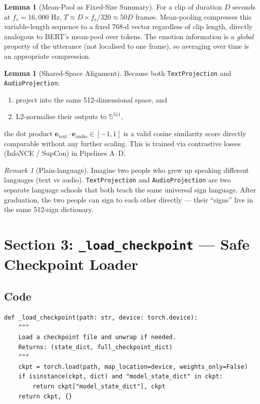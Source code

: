 \documentclass[12pt,a4paper]{article}
\theoremstyle{definition}
\newtheorem{lemma}[theorem]{Lemma}
\theoremstyle{remark}
\newtheorem{remark}[theorem]{Remark}
\begin{document}
\begin{lemma}[Mean-Pool as Fixed-Size Summary]
For a clip of duration $D$ seconds at $f_s = 16{,}000$ Hz,
$T \approx D \times f_s / 320 \approx 50D$ frames.
Mean-pooling compresses this variable-length sequence to a fixed 768-d vector
regardless of clip length, directly analogous to BERT's mean-pool over tokens.
The emotion information is a \emph{global} property of the utterance
(not localised to one frame), so averaging over time is an appropriate compression.
\end{lemma}

\begin{lemma}[Shared-Space Alignment]
Because both \texttt{TextProjection} and \texttt{AudioProjection}:
\begin{enumerate}
  \item project into the same 512-dimensional space, and
  \item L2-normalise their outputs to $\mathbb{S}^{511}$,
\end{enumerate}
the dot product
$\mathbf{e}_{\text{text}} \cdot \mathbf{e}_{\text{audio}} \in [-1, 1]$
is a valid cosine similarity score directly comparable without any further
scaling.
This is trained via contrastive losses (InfoNCE / SupCon) in Pipelines A--D.
\end{lemma}

\begin{remark}[Plain-language]
Imagine two people who grew up speaking different languages (text vs audio).
\texttt{TextProjection} and \texttt{AudioProjection} are two separate
language schools that both teach the same universal sign language.
After graduation, the two people can sign to each other directly —
their ``signs'' live in the same 512-sign dictionary.
\end{remark}

\section{Section 3: \texttt{\_load\_checkpoint} — Safe Checkpoint Loader}

\subsection{Code}

\begin{lstlisting}[caption={\texttt{\_load\_checkpoint} function}]
def _load_checkpoint(path: str, device: torch.device):
    """
    Load a checkpoint file and unwrap if needed.
    Returns: (state_dict, full_checkpoint_dict)
    """
    ckpt = torch.load(path, map_location=device, weights_only=False)
    if isinstance(ckpt, dict) and "model_state_dict" in ckpt:
        return ckpt["model_state_dict"], ckpt
    return ckpt, {}
\end{lstlisting}
\end{document}
